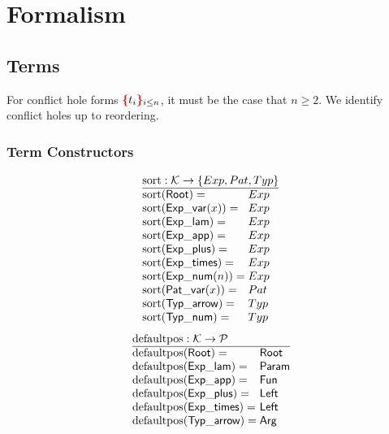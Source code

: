 \section{Formalism}


\subsection{Terms}

\figureTermSyntaxContent

For conflict hole forms $\textcolor{red}{\textbf{\{}}t_i\textcolor{red}{\textbf{\}}}_{i \leq n}$, it must be the case that $n \geq 2$.
We identify conflict holes up to reordering.


\subsubsection{Term Constructors}

\[
  \arraycolsep=0pt
  \begin{array}{ll}
    \multicolumn{2}{l}{\sortOp : \K \to \SetOf{Exp, Pat, Typ}} \\
    \hline
    \sort{\Root}={} & Exp \\
    \sort{\ExpVar(x)}={} & Exp \\
    \sort{\ExpLam}={} & Exp \\
    \sort{\ExpApp}={} & Exp \\
    \sort{\ExpPlus}={} & Exp \\
    \sort{\ExpTimes}={} & Exp \\
    \sort{\ExpNum(n)}={} & Exp \\
    \sort{\PatVar(x)}={} & Pat \\
    \sort{\TypArrow}={} & Typ \\
    \sort{\TypNum}={} & Typ \\
  \end{array}
\]
%
\figureArityContent
%
\[
  \arraycolsep=0pt
  \begin{array}{ll}
    \multicolumn{2}{l}{\defaultposOp : \K \to \P} \\
    \hline
    \defaultpos{\Root}={} & \Root \\
    \defaultpos{\ExpLam}={} & \LamParam \\
    \defaultpos{\ExpApp}={} & \AppFun \\
    \defaultpos{\ExpPlus}={} & \PlusLeft \\
    \defaultpos{\ExpTimes}={} & \TimesLeft \\
    \defaultpos{\TypArrow}={} & \ArrowArg \\
  \end{array}
\]

